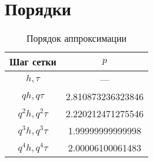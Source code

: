 \documentclass{article}
\begin{document}
	\section{Порядки}
	\begin{table}[H]
		\centering
		\caption{Порядок аппроксимации}
		\begin{tabular}{|c|c|}
			\hline
			Шаг сетки & $p$ \\ \hline
			$h, \tau$ & --- \\ \hline 
			$q h, q \tau$ &  2.810873236323846 \\ \hline 
			$q^2 h, q^2 \tau$ & 2.220212471275546 \\ \hline 
			$q^3 h, q^3 \tau$ & 1.99999999999998 \\ \hline 
			$q^4 h, q^{4} \tau$ & 2.00006100061483 \\ \hline 
	
		\end{tabular}
	\end{table}
\end{document}
